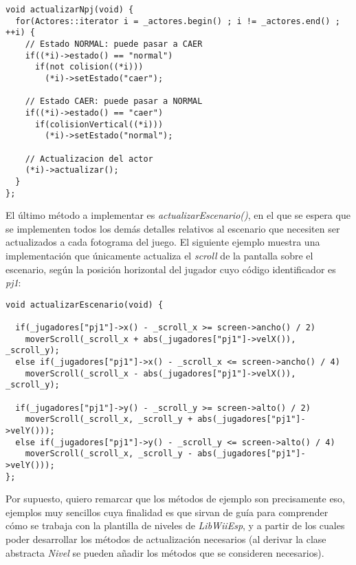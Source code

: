 \begin{lstlisting}[style=C++]
void actualizarNpj(void) {
  for(Actores::iterator i = _actores.begin() ; i != _actores.end() ; ++i) {
    // Estado NORMAL: puede pasar a CAER
    if((*i)->estado() == "normal")
      if(not colision((*i)))
        (*i)->setEstado("caer");

    // Estado CAER: puede pasar a NORMAL
    if((*i)->estado() == "caer")
      if(colisionVertical((*i)))
        (*i)->setEstado("normal");

    // Actualizacion del actor
    (*i)->actualizar();
  }
};
\end{lstlisting}

El último método a implementar es \emph{actualizarEscenario()}, en el que se espera que se implementen todos los demás detalles relativos al escenario que necesiten ser actualizados a cada fotograma del juego. El siguiente ejemplo muestra una implementación que únicamente actualiza el \emph{scroll} de la pantalla sobre el escenario, según la posición horizontal del jugador cuyo código identificador es \emph{pj1}:

\begin{lstlisting}[style=C++]
void actualizarEscenario(void) {

  if(_jugadores["pj1"]->x() - _scroll_x >= screen->ancho() / 2)
    moverScroll(_scroll_x + abs(_jugadores["pj1"]->velX()), _scroll_y);
  else if(_jugadores["pj1"]->x() - _scroll_x <= screen->ancho() / 4)
    moverScroll(_scroll_x - abs(_jugadores["pj1"]->velX()), _scroll_y);

  if(_jugadores["pj1"]->y() - _scroll_y >= screen->alto() / 2)
    moverScroll(_scroll_x, _scroll_y + abs(_jugadores["pj1"]->velY()));
  else if(_jugadores["pj1"]->y() - _scroll_y <= screen->alto() / 4)
    moverScroll(_scroll_x, _scroll_y - abs(_jugadores["pj1"]->velY()));
};
\end{lstlisting}

Por supuesto, quiero remarcar que los métodos de ejemplo son precisamente eso, ejemplos muy sencillos cuya finalidad es que sirvan de guía para comprender cómo se trabaja con la plantilla de niveles de \emph{LibWiiEsp}, y a partir de los cuales poder desarrollar los métodos de actualización necesarios (al derivar la clase abstracta \emph{Nivel} se pueden añadir los métodos que se consideren necesarios).\\

